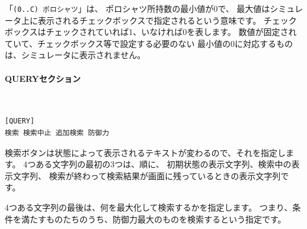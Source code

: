 \documentclass[dvipdfmx]{jsarticle}
\begin{document}
「\texttt{(0..C) ポロシャツ}」は、
ポロシャツ所持数の最小値が0で、
最大値はシミュレータ上に表示されるチェックボックスで指定されるという意味です。
チェックボックスはチェックされていれば1、いなければ0を表します。
数値が固定されていて、チェックボックス等で設定する必要のない
最小値の0に対応するものは、シミュレータに表示されません。

\begin{center}
\end{center}

\paragraph{QUERYセクション}~\medskip
{\footnotesize\begin{mdframed}\begin{Verbatim}
[QUERY]
検索 検索中止 追加検索 防御力
\end{Verbatim}
\end{mdframed}}
\medskip

検索ボタンは状態によって表示されるテキストが変わるので、それを指定します。
4つある文字列の最初の3つは、順に、
初期状態の表示文字列、検索中の表示文字列、
検索が終わって検索結果が画面に残っているときの表示文字列です。

4つある文字列の最後は、何を最大化して検索するかを指定します。
つまり、条件を満たすものたちのうち、防御力最大のものを検索するという指定です。

\begin{center}
\end{center}
\end{document}

